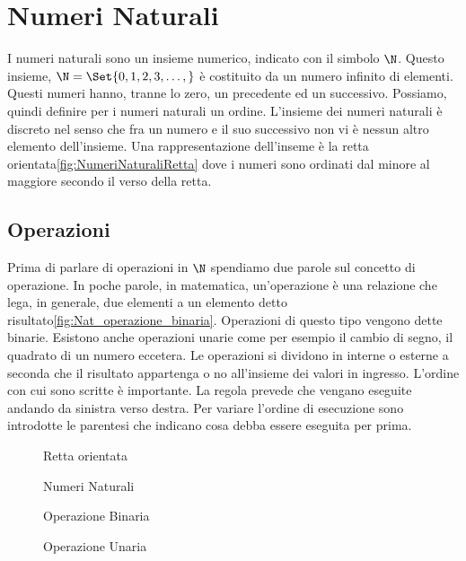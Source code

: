 \chapter{Numeri Naturali}
\label{cha:NumeriNaturali}
\minitoc
\mtcskip                                %
\minilof                                %
\mtcskip                                %
\minilot
I numeri naturali sono un insieme numerico, indicato con il simbolo $\N$. Questo insieme, $\N=\Set{0,1,2,3,\dots,}$ è  costituito da un numero infinito di elementi. Questi numeri hanno, tranne lo zero, un precedente ed un successivo. Possiamo, quindi definire per i numeri naturali un ordine.  L'insieme dei numeri naturali è discreto nel senso che fra un numero e il suo successivo non vi è nessun altro elemento dell'insieme. Una rappresentazione dell'inseme  è la retta orientata\nobs\vref{fig:NumeriNaturaliRetta} dove i numeri sono ordinati dal minore al maggiore secondo il verso della retta. 
\section{Operazioni}
Prima di parlare di operazioni in $\N$ spendiamo due parole sul concetto di operazione. In poche parole,  in matematica, un'operazione è una relazione che lega, in generale, due elementi a un elemento detto risultato\nobs\vref{fig:Nat_operazione_binaria}. Operazioni di questo tipo vengono dette binarie. Esistono anche operazioni unarie come per esempio il cambio di segno, il quadrato di un numero eccetera.   Le operazioni si dividono in interne o esterne a seconda che il risultato appartenga o no all'insieme dei valori in ingresso. L'ordine con cui sono scritte è importante. La regola prevede che vengano eseguite andando da sinistra verso destra. Per variare l'ordine di esecuzione sono introdotte le parentesi che indicano cosa debba essere eseguita per prima.
\begin{figure} [htbp]
	\centering

	\caption{Retta orientata}
	\label{fig:NumeriNaturaliRetta}\end{figure}
\begin{figure} 
	\centering

	\caption{Numeri Naturali}
	\label{fig:NumeriNaturali}\end{figure}
\begin{figure} 
	\centering

	\caption{Operazione Binaria}
	\label{fig:Nat_operazione_binaria}\end{figure}
\begin{figure} 
	\centering

	\caption{Operazione Unaria}
	\label{fig:Nat_operazione_unaria}\end{figure}
